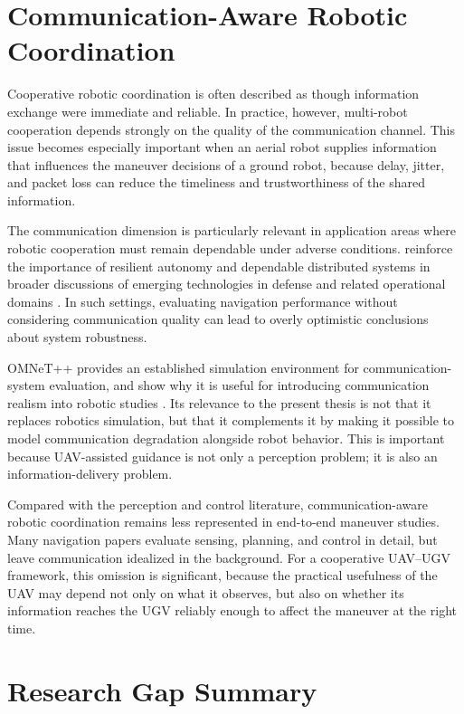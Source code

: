 \section{Communication-Aware Robotic Coordination}

Cooperative robotic coordination is often described as though information exchange were immediate and reliable. In practice, however, multi-robot cooperation depends strongly on the quality of the communication channel. This issue becomes especially important when an aerial robot supplies information that influences the maneuver decisions of a ground robot, because delay, jitter, and packet loss can reduce the timeliness and trustworthiness of the shared information.

The communication dimension is particularly relevant in application areas where robotic cooperation must remain dependable under adverse conditions. \citeauthor{bhatia2026integration} reinforce the importance of resilient autonomy and dependable distributed systems in broader discussions of emerging technologies in defense and related operational domains \citep{bhatia2026integration}. In such settings, evaluating navigation performance without considering communication quality can lead to overly optimistic conclusions about system robustness.

OMNeT++ provides an established simulation environment for communication-system evaluation, and \citeauthor{varga2008omnet} show why it is useful for introducing communication realism into robotic studies \citep{varga2008omnet}. Its relevance to the present thesis is not that it replaces robotics simulation, but that it complements it by making it possible to model communication degradation alongside robot behavior. This is important because UAV-assisted guidance is not only a perception problem; it is also an information-delivery problem.

Compared with the perception and control literature, communication-aware robotic coordination remains less represented in end-to-end maneuver studies. Many navigation papers evaluate sensing, planning, and control in detail, but leave communication idealized in the background. For a cooperative UAV--UGV framework, this omission is significant, because the practical usefulness of the UAV may depend not only on what it observes, but also on whether its information reaches the UGV reliably enough to affect the maneuver at the right time.

\section{Research Gap Summary}

